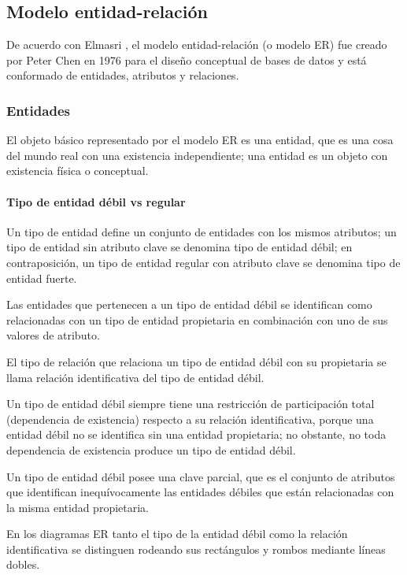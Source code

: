 
\subsection{Modelo entidad-relación}

De acuerdo con Elmasri \cite{ramez_elmasri_fundamentos_nodate}, el modelo entidad-relación (o modelo ER) fue creado por Peter Chen en 1976\cite{chen_entity-relationship_nodate} para el diseño conceptual de bases de datos y está conformado de entidades, atributos y relaciones. 

\subsubsection{Entidades}
El objeto básico representado por el modelo ER es una entidad, que es una cosa del mundo real con una existencia independiente; una entidad es un objeto con existencia física o conceptual.

\paragraph*{Tipo de entidad débil vs regular}

Un tipo de entidad define un conjunto de entidades con los mismos atributos; un tipo de entidad sin atributo clave se denomina tipo de entidad débil; en contraposición, un tipo de entidad regular con atributo clave se denomina tipo de entidad fuerte.


Las entidades que pertenecen a un tipo de entidad débil se identifican como relacionadas con un tipo de entidad propietaria en combinación con uno de sus valores de atributo.


El tipo de relación que relaciona un tipo de entidad débil con su propietaria se llama relación identificativa del tipo de entidad débil. 


Un tipo de entidad débil siempre tiene una restricción de participación total (dependencia de existencia) respecto a su relación identificativa, porque una entidad débil no se identifica sin una entidad propietaria; no obstante, no toda dependencia de existencia produce un tipo de entidad débil.


Un tipo de entidad débil posee una clave parcial, que es el conjunto de atributos que identifican inequívocamente las entidades débiles que están relacionadas con la misma entidad propietaria. 


En los diagramas ER tanto el tipo de la entidad débil como la relación identificativa se distinguen rodeando sus rectángulos y rombos mediante líneas dobles.


